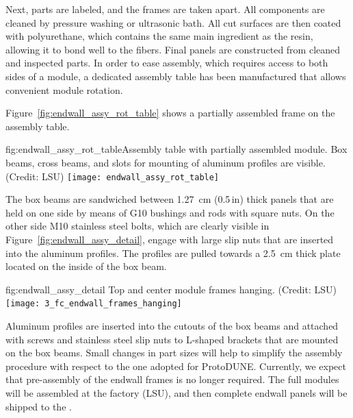 Next, parts are labeled, and the frames are taken apart. All components are cleaned by pressure washing or ultrasonic bath. All cut  surfaces are then coated with polyurethane, which contains the same main ingredient as the  resin, allowing it to bond well to the  fibers. Final panels are constructed from cleaned and inspected parts. In order to ease assembly, which requires access to both sides of a module,
a dedicated assembly table has been manufactured that allows convenient module rotation. 

Figure~\ref{fig:endwall_assy_rot_table} shows a partially assembled   frame on the assembly table.
\begin{dunefigure}{fig:endwall_assy_rot_table}{Assembly table with partially assembled  module. Box beams, cross beams, and slots for mounting of aluminum profiles are visible. (Credit: LSU)}
 \texttt{[image: endwall\_assy\_rot\_table]}
 \end{dunefigure}
The  box beams are sandwiched between \SI{1.27}{\cm} (\num{0.5}\,in) thick  panels that are held on one side by means of G10 bushings and rods with square nuts.
On the other side M10 stainless steel bolts, which are clearly visible in Figure~\ref{fig:endwall_assy_detail},  
engage with large slip nuts that are inserted into the aluminum profiles. The profiles 
are pulled towards a \SI{2.5}{\cm} thick  plate located 
on the inside of the box beam.
%

\begin{dunefigure} %
{fig:endwall_assy_detail}{%
Top and center  module frames hanging. (Credit: LSU)}
\texttt{[image: 3\_fc\_endwall\_frames\_hanging]}
\end{dunefigure}


Aluminum profiles are inserted into the cutouts of the box beams and attached with screws and stainless steel slip nuts to L-shaped  brackets that are mounted on the  box beams. Small changes in part sizes will help to simplify the assembly  procedure with respect to the one adopted for ProtoDUNE. Currently, we expect that pre-assembly of the  endwall frames is no longer required. The full modules will be assembled at the factory (LSU), and then complete  endwall panels will be shipped to the . 



